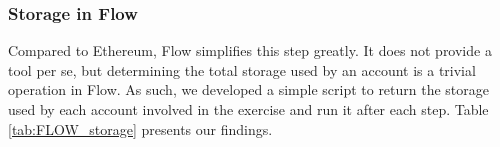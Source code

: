 \documentclass[../NFTComp_IEEE.tex]{subfiles}
\begin{document}
\subsubsection{Storage in Flow}

Compared to Ethereum, Flow simplifies this step greatly. It does not provide a tool per se, but determining the total storage used by an account is a trivial operation in Flow. As such, we developed a simple script to return the storage used by each account involved in the exercise and run it after each step. Table \ref{tab:FLOW_storage} presents our findings.

\begin{table}[ht]
    \centering
    \caption{FLOW token balance of each account in the exercise}
    \vspace{0.1cm}
    \label{tab:FLOW_storage}
\end{table}
\end{document}
